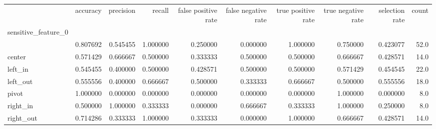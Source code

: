 \begin{tabular}{lrrrrrrrrr}
\toprule
{} &  accuracy &  precision &    recall &  false positive rate &  false negative rate &  true positive rate &  true negative rate &  selection rate &  count \\
sensitive\_feature\_0 &           &            &           &                      &                      &                     &                     &                 &        \\
\midrule
                    &  0.807692 &   0.545455 &  1.000000 &             0.250000 &             0.000000 &            1.000000 &            0.750000 &        0.423077 &   52.0 \\
center              &  0.571429 &   0.666667 &  0.500000 &             0.333333 &             0.500000 &            0.500000 &            0.666667 &        0.428571 &   14.0 \\
left\_in             &  0.545455 &   0.400000 &  0.500000 &             0.428571 &             0.500000 &            0.500000 &            0.571429 &        0.454545 &   22.0 \\
left\_out            &  0.555556 &   0.400000 &  0.666667 &             0.500000 &             0.333333 &            0.666667 &            0.500000 &        0.555556 &   18.0 \\
pivot               &  1.000000 &   0.000000 &  0.000000 &             0.000000 &             0.000000 &            0.000000 &            1.000000 &        0.000000 &    8.0 \\
right\_in            &  0.500000 &   1.000000 &  0.333333 &             0.000000 &             0.666667 &            0.333333 &            1.000000 &        0.250000 &    8.0 \\
right\_out           &  0.714286 &   0.333333 &  1.000000 &             0.333333 &             0.000000 &            1.000000 &            0.666667 &        0.428571 &   14.0 \\
\bottomrule
\end{tabular}
